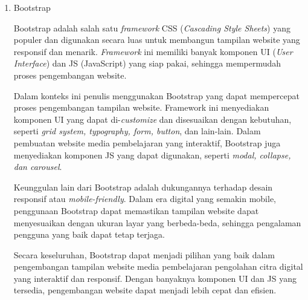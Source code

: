 \begin{enumerate}[leftmargin=1cm, itemindent=0.6cm,labelwidth=15pt, labelsep=5pt, listparindent=1cm,align=left]
	\item Bootstrap

	      Bootstrap adalah salah satu \textit{framework} CSS (\textit{Cascading Style Sheets}) yang populer dan digunakan secara luas untuk membangun tampilan website yang responsif dan menarik. \textit{Framework} ini memiliki banyak komponen UI (\textit{User Interface}) dan JS (JavaScript) yang siap pakai, sehingga mempermudah proses pengembangan website.

	      Dalam konteks ini penulis menggunakan Bootstrap yang dapat mempercepat proses pengembangan tampilan website. Framework ini menyediakan komponen UI yang dapat di-\textit{customize} dan disesuaikan dengan kebutuhan, seperti \textit{grid system, typography, form, button}, dan lain-lain. Dalam pembuatan website media pembelajaran yang interaktif, Bootstrap juga menyediakan komponen JS yang dapat digunakan, seperti \textit{modal, collapse, dan carousel}.

	      Keunggulan lain dari Bootstrap adalah dukungannya terhadap desain responsif atau \textit{mobile-friendly}. Dalam era digital yang semakin mobile, penggunaan Bootstrap dapat memastikan tampilan website dapat menyesuaikan dengan ukuran layar yang berbeda-beda, sehingga pengalaman pengguna yang baik dapat tetap terjaga.

	      Secara keseluruhan, Bootstrap dapat menjadi pilihan yang baik dalam pengembangan tampilan website media pembelajaran pengolahan citra digital yang interaktif dan responsif. Dengan banyaknya komponen UI dan JS yang tersedia, pengembangan website dapat menjadi lebih cepat dan efisien.
\end{enumerate}
